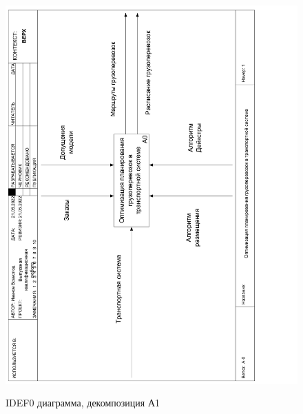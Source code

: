 \begin{figure}[h]
	\begin{center}
		{\includegraphics[scale=0.5, angle=-90, page=3]{img/idef0.pdf}}
		\caption{IDEF0 диаграмма, декомпозиция А1}
		\label{idef0:A1}
	\end{center}
\end{figure}

